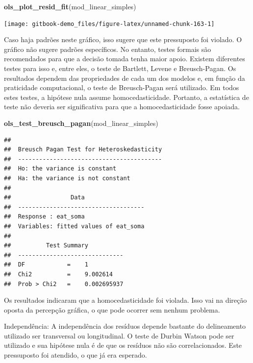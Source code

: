 \documentclass[
]{book}
\newenvironment{Shaded}{\begin{snugshade}}{\end{snugshade}}
\newcommand{\KeywordTok}[1]{\textcolor[rgb]{0.13,0.29,0.53}{\textbf{#1}}}
\newcommand{\NormalTok}[1]{#1}
\begin{document}
\begin{Shaded}
\begin{Highlighting}[]
\KeywordTok{ols_plot_resid_fit}\NormalTok{(mod_linear_simples)}
\end{Highlighting}
\end{Shaded}

\begin{center}\texttt{[image: gitbook-demo\_files/figure-latex/unnamed-chunk-163-1]} \end{center}

Caso haja padrões neste gráfico, isso sugere que este pressuposto foi violado. O gráfico não sugere padrões específicos. No entanto, testes formais são recomendados para que a decisão tomada tenha maior apoio. Existem diferentes testes para isso e, entre eles, o teste de Bartlett, Levene e Breusch-Pagan. Os resultados dependem das propriedades de cada um dos modelos e, em função da praticidade computacional, o teste de Breusch-Pagan será utilizado. Em todos estes testes, a hipótese nula assume homocedasticidade. Portanto, a estatística de teste não deveria ser significativa para que a homocedasticidade fosse apoiada.

\begin{Shaded}
\begin{Highlighting}[]
\KeywordTok{ols_test_breusch_pagan}\NormalTok{(mod_linear_simples)}
\end{Highlighting}
\end{Shaded}

\begin{verbatim}
## 
##  Breusch Pagan Test for Heteroskedasticity
##  -----------------------------------------
##  Ho: the variance is constant            
##  Ha: the variance is not constant        
## 
##                 Data                 
##  ------------------------------------
##  Response : eat_soma 
##  Variables: fitted values of eat_soma 
## 
##          Test Summary          
##  ------------------------------
##  DF            =    1 
##  Chi2          =    9.002614 
##  Prob > Chi2   =    0.002695937
\end{verbatim}

Os resultados indicaram que a homocedasticidade foi violada. Isso vai na direção oposta da percepção gráfica, o que pode ocorrer sem nenhum problema.

Independência: A independência dos resíduos depende bastante do delineamento utilizado ser transversal ou longitudinal. O teste de Durbin Watson pode ser utilizado e sua hipótese nula é de que os resíduos não são correlacionados. Este pressuposto foi atendido, o que já era esperado.
\end{document}
